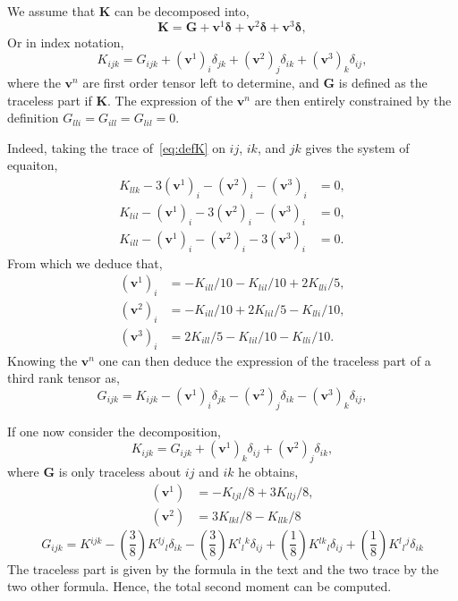 We assume that $\textbf{K}$ can be decomposed into,
 \begin{equation}
    \textbf{K} = \textbf{G} + \textbf{v}^1 \bm\delta + \textbf{v}^2 \bm\delta + \textbf{v}^3 \bm\delta, 
 \end{equation}
Or in index notation, 
\begin{equation}
   K_{ijk} = G_{ijk} + (\textbf{v}^1)_i \delta_{jk} + (\textbf{v}^2)_j \delta_{ik} + (\textbf{v}^3)_k \delta_{ij}, 
   \label{eq:defK}
\end{equation}
where the $\textbf{v}^n$ are first order tensor left to determine, and \textbf{G} is defined as the traceless part if \textbf{K}. 
The expression of the $\textbf{v}^n$ are then entirely constrained by the definition $G_{lli}=G_{ill}=G_{lil}=0$. 

Indeed, taking the trace of~\ref{eq:defK} on $ij$, $ik$, and $jk$ gives the system of equaiton, 
\begin{align}
    K_{llk} - 3(\textbf{v}^1)_i - (\textbf{v}^2)_i - (\textbf{v}^3)_i &= 0,\\
    K_{lil} - (\textbf{v}^1)_i - 3(\textbf{v}^2)_i - (\textbf{v}^3)_i &= 0,\\
    K_{ill} - (\textbf{v}^1)_i - (\textbf{v}^2)_i - 3(\textbf{v}^3)_i &= 0. 
\end{align}
From which we deduce that, 
\begin{align}
    (\textbf{v}^1)_i &=  -K_{ill}/10 - K_{lil}/10 + 2K_{lli}/5,\\
    (\textbf{v}^2)_i &=  -K_{ill}/10 + 2K_{lil}/5 - K_{lli}/10,\\
    (\textbf{v}^3)_i &=  2K_{ill}/5 - K_{lil}/10 - K_{lli}/10. 
\end{align}
Knowing the $\textbf{v}^n$ one can then deduce the expression of the traceless part of a third rank tensor as, 
\begin{equation}
    G_{ijk} = K_{ijk}  - (\textbf{v}^1)_i \delta_{jk} - (\textbf{v}^2)_j \delta_{ik} - (\textbf{v}^3)_k \delta_{ij}, 
\end{equation}
 
If one now consider the decomposition, 
\begin{equation}
    K_{ijk} = G_{ijk}  + (\textbf{v}^1)_k \delta_{ij} + (\textbf{v}^2)_j \delta_{ik}, 
\end{equation}
where $\textbf{G}$ is only traceless about $ij$ and $ik$ he obtains, 
\begin{align}
    (\textbf{v}^1) &=  -K_{ljl}/8 + 3K_{llj}/8, \\
    (\textbf{v}^2) &=  3K_{lkl}/8 - K_{llk}/8
\end{align}
\begin{equation}
    G_{ijk} = 
    K{}^{ijk}
    -\left(\frac{3}{8}\right)K{}^{lj}{}_{l}\delta_{ik} - \left(\frac{3}{8}\right)K{}^{l}{}_{l}{}^{k}\delta_{ij}  + \left(\frac{1}{8}\right)K{}^{lk}{}_{l}\delta_{ij} + \left(\frac{1}{8}\right)K{}^{l}{}_{l}{}^{j}\delta_{ik}
\end{equation}
The traceless part is given by the formula in the text and the two trace by the two other formula. 
Hence, the total second moment can be computed. 


